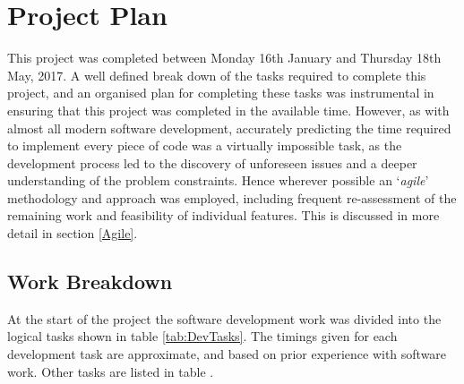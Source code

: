 
\chapter[Project Plan]{Project Plan} %

\label{Chapter3} %


This project was completed between Monday 16th January and Thursday 18th May, 2017. A well defined break down of the tasks required to complete this project, and an organised plan for completing these tasks was instrumental in ensuring that this project was completed in the available time. However, as with almost all modern software development, accurately predicting the time required to implement every piece of code was a virtually impossible task, as the development process led to the discovery of unforeseen issues and a deeper understanding of the problem constraints. Hence wherever possible an `\textit{agile}' methodology and approach was employed, including frequent re-assessment of the remaining work and feasibility of individual features. This is discussed in more detail in section \ref{Agile}.


\section{Work Breakdown}
At the start of the project the software development work was divided into the logical tasks shown in table \ref{tab:DevTasks}. The timings given for each development task are approximate, and based on prior experience with software work. Other tasks are listed in table .

